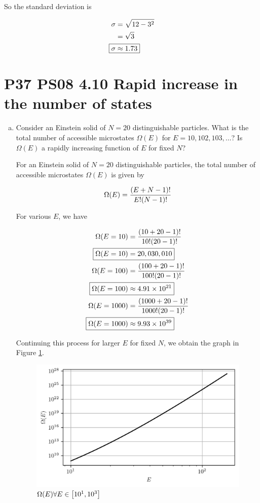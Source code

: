 \documentclass[9pt,a4paper,twocolumn]{article}
\begin{document}
So the standard deviation is

\begin{align}
	\sigma &= \sqrt{12 - 3^2} \nonumber \\
	&= \sqrt{3} \nonumber \\
	\Aboxed{
		\sigma &\approx 1.73
	}
\end{align}

\section{P37 PS08 4.10 Rapid increase in the number of states}

\begin{enumerate}[(a)]

\item Consider an Einstein solid of $N = 20$ distinguishable particles. What is the total number of accessible microstates $\Omega (E)$ for $E = 10, 102, 103, \hdots$? Is $\Omega (E)$ a rapidly increasing function of $E$ for fixed $N$?

For an Einstein solid of $N=20$ distinguishable particles, the total number of accessible microstates $\Omega(E)$ is given by

\begin{equation}
	\Omega(E) = \frac{\qty(E + N - 1)!}{E!\qty(N-1)!} \label{eq:accessible}
\end{equation}

For various $E$, we have

\begin{align}
	\Omega(E = 10) &= \frac{\qty(10 + 20 - 1)!}{10!\qty(20-1)!} \nonumber \\
	\Aboxed{
		\Omega(E = 10) &= 20,030,010
	} \\
	\Omega(E=100) &= \frac{\qty(100 + 20 - 1)!}{100!\qty(20-1)!} \nonumber \\
	\Aboxed{
		\Omega(E = 100) &\approx 4.91 \times 10^{21}
	} \\
	\Omega(E=1000) &= \frac{\qty(1000 + 20 - 1)!}{1000!\qty(20-1)!} \nonumber \\
	\Aboxed{
		\Omega(E = 1000) &\approx 9.93 \times 10^{39}
	} 
\end{align}

Continuing this process for larger $E$ for fixed $N$, we obtain the graph in Figure \ref{fig:microstates}.

\begin{figure}[h!]
	\centering
	\includegraphics[width=0.75\linewidth]{microstates.png}
	\caption{$\Omega(E) \forall E \in \qty[10^1, 10^3]$}
	\label{fig:microstates}
\end{figure}


\end{enumerate}
\end{document}
